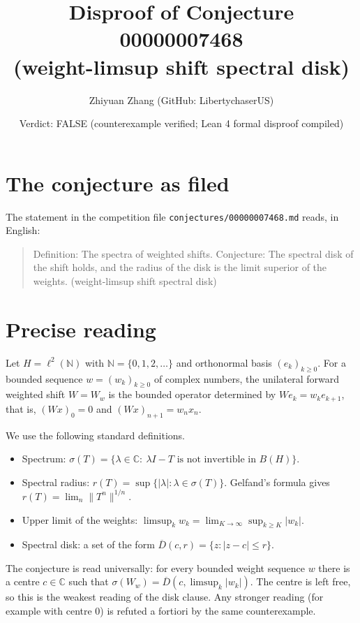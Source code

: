 \documentclass[11pt]{article}
\title{Disproof of Conjecture 00000007468\\(weight-limsup shift spectral disk)}
\author{Zhiyuan Zhang (GitHub: LibertychaserUS)}
\date{Verdict: FALSE (counterexample verified; Lean 4 formal disproof compiled)}
\theoremstyle{definition}
\begin{document}
\maketitle

\section{The conjecture as filed}

The statement in the competition file \texttt{conjectures/00000007468.md} reads, in English:

\begin{quote}
Definition: The spectra of weighted shifts. Conjecture: The spectral disk of the shift holds,
and the radius of the disk is the limit superior of the weights.
(weight-limsup shift spectral disk)
\end{quote}

\section{Precise reading}

Let $H=\ell^2(\mathbb{N})$ with $\mathbb{N}=\{0,1,2,\dots\}$ and orthonormal basis $(e_k)_{k\ge 0}$.
For a bounded sequence $w=(w_k)_{k\ge 0}$ of complex numbers, the unilateral forward weighted shift
$W=W_w$ is the bounded operator determined by $W e_k = w_k e_{k+1}$, that is,
$(Wx)_0=0$ and $(Wx)_{n+1}=w_n x_n$.

We use the following standard definitions.
\begin{itemize}
\item Spectrum: $\sigma(T)=\{\lambda\in\mathbb{C}:\ \lambda I-T \text{ is not invertible in } B(H)\}$.
\item Spectral radius: $r(T)=\sup\{|\lambda|:\lambda\in\sigma(T)\}$. Gelfand's formula gives $r(T)=\lim_n\|T^n\|^{1/n}$.
\item Upper limit of the weights: $\limsup_k w_k=\lim_{K\to\infty}\sup_{k\ge K}|w_k|$.
\item Spectral disk: a set of the form $\overline{D}(c,r)=\{z:|z-c|\le r\}$.
\end{itemize}

The conjecture is read universally: for every bounded weight sequence $w$ there is a centre $c\in\mathbb{C}$
such that $\sigma(W_w)=\overline{D}(c,\limsup_k|w_k|)$.
The centre is left free, so this is the weakest reading of the disk clause.
Any stronger reading (for example with centre $0$) is refuted a fortiori by the same counterexample.
\end{document}
